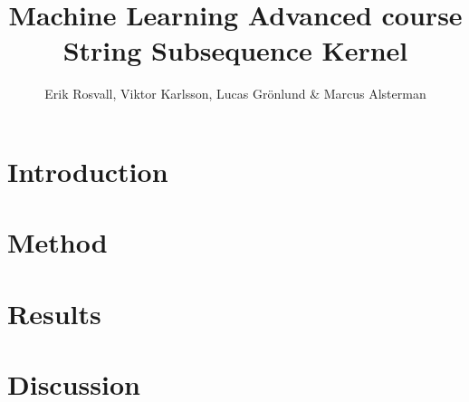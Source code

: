 \documentclass[10pt,a4paper,titlepage]{article}
\author{Erik Rosvall, Viktor Karlsson, Lucas Grönlund \& Marcus Alsterman}
\title{Machine Learning Advanced course \\ String Subsequence Kernel}
\begin{document}
	\maketitle
	
	\section{Introduction}
	
	
	\section{Method}
	

	\section{Results}
	
	
	\section{Discussion}
	
	
	
	
	
\end{document}
